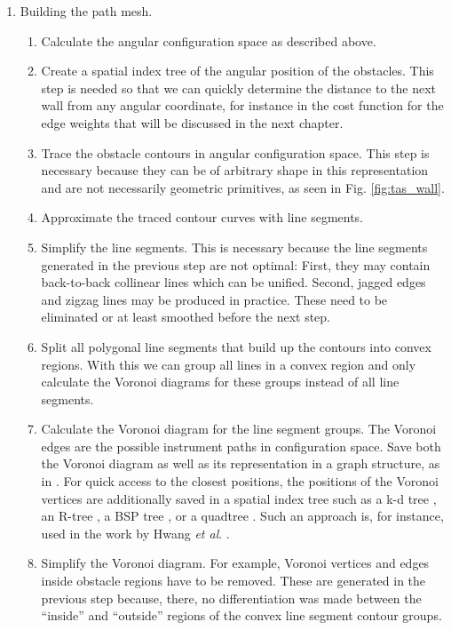 \begin{enumerate}
	\item Building the path mesh.
	\begin{enumerate}
		\item Calculate the angular configuration space as described above.
		\item Create a spatial index tree of the angular position of the obstacles.
			This step is needed so that we can quickly determine the distance to
			the next wall from any angular coordinate, for instance in the cost
			function for the edge weights that will be discussed in the next chapter.
		\item Trace the obstacle contours in angular configuration space. 
			This step is necessary because they can be of arbitrary
			shape in this representation and are not necessarily geometric 
			primitives, as seen in Fig. \ref{fig:tas_wall}.
		\item Approximate the traced contour curves with line segments.
		\item Simplify the line segments. This is necessary because the line 
			segments generated in the previous step are not optimal:
			First, they may contain back-to-back collinear lines which can be 
			unified. Second, jagged edges and zigzag lines may be
			produced in practice. These need to be eliminated or at least smoothed 
			before the next step.
		\item Split all polygonal line segments that build up the contours into 
			convex regions. With this we can group all lines in a convex region 
			and only calculate the Voronoi diagrams for these groups instead of 
			all line segments.
		\item Calculate the Voronoi diagram for the line segment groups. 
			The Voronoi edges are the possible instrument paths in configuration 
			space. Save both the Voronoi diagram as well as its representation 
			in a graph structure, as in \cite[p. 163]{Berg2008}.
			For quick access to the closest positions, the positions of the
			Voronoi vertices are additionally saved in a spatial index tree such as a 
			k-d tree \cite{TODO}, an R-tree \cite{TODO}, a BSP tree \cite{TODO}, 
			or a quadtree \cite{TODO}. 
			Such an approach is, for instance, used in the work by 
			Hwang \textit{et al}. \cite{Hwang2003}.
		\item Simplify the Voronoi diagram. For example, Voronoi vertices and 
			edges inside obstacle regions have to be removed.
			These are generated in the previous step because, there, no 
			differentiation was made between the ``inside'' and ``outside'' 
			regions of the convex line segment contour groups.
	\end{enumerate}


\end{enumerate}
